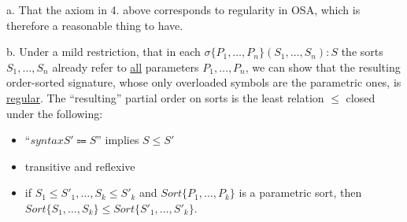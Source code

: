 \documentclass[UTF8,11pt]{article}
\theoremstyle{plain}
\theoremstyle{definition}
\theoremstyle{remark}
\begin{document}
a. That the axiom in 4. above corresponds to regularity in OSA, which is therefore a reasonable thing to have.

b. Under a mild restriction, that in each $\sigma \{P_1, \dots , P_n\}(S_1, \dots, S_n):S$ the sorts $S_1,\dots,S_n$ already refer to \underline{all} parameters $P_1, \dots , P_n$, we can show that the resulting order-sorted signature, whose only overloaded symbols are the parametric ones, is \underline{regular}. The ``resulting'' partial order on sorts is the least relation $\le$ closed under the following:

\begin{itemize}
\item ``$syntax S' \Coloneqq S$'' implies $S \le S'$
\item transitive and reflexive
\item if $S_1 \le S'_1, \dots, S_k \le S'_k$ and $Sort\{P_1,\dots,P_k\}$ is a parametric sort, then $Sort\{S_1,\dots,S_k\} \le Sort\{S'_1,\dots,S'_k\}$.
\end{itemize}
\end{document}

